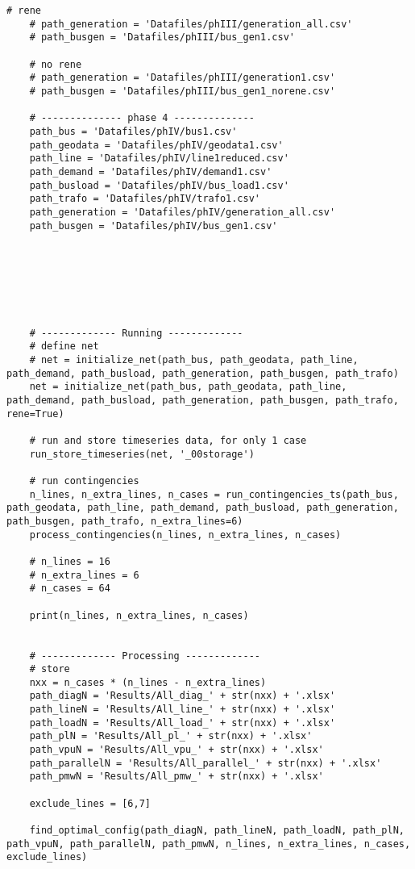 \begin{lstlisting}[caption={Main code in Python with the Pandapower library}]
    # rene
    # path_generation = 'Datafiles/phIII/generation_all.csv'
    # path_busgen = 'Datafiles/phIII/bus_gen1.csv'

    # no rene
    # path_generation = 'Datafiles/phIII/generation1.csv'
    # path_busgen = 'Datafiles/phIII/bus_gen1_norene.csv'

    # -------------- phase 4 --------------
    path_bus = 'Datafiles/phIV/bus1.csv'
    path_geodata = 'Datafiles/phIV/geodata1.csv'
    path_line = 'Datafiles/phIV/line1reduced.csv'
    path_demand = 'Datafiles/phIV/demand1.csv'
    path_busload = 'Datafiles/phIV/bus_load1.csv'
    path_trafo = 'Datafiles/phIV/trafo1.csv'
    path_generation = 'Datafiles/phIV/generation_all.csv'
    path_busgen = 'Datafiles/phIV/bus_gen1.csv'







    # ------------- Running -------------
    # define net
    # net = initialize_net(path_bus, path_geodata, path_line, path_demand, path_busload, path_generation, path_busgen, path_trafo)
    net = initialize_net(path_bus, path_geodata, path_line, path_demand, path_busload, path_generation, path_busgen, path_trafo, rene=True)

    # run and store timeseries data, for only 1 case
    run_store_timeseries(net, '_00storage')

    # run contingencies
    n_lines, n_extra_lines, n_cases = run_contingencies_ts(path_bus, path_geodata, path_line, path_demand, path_busload, path_generation, path_busgen, path_trafo, n_extra_lines=6)
    process_contingencies(n_lines, n_extra_lines, n_cases)

    # n_lines = 16
    # n_extra_lines = 6
    # n_cases = 64

    print(n_lines, n_extra_lines, n_cases)


    # ------------- Processing -------------
    # store
    nxx = n_cases * (n_lines - n_extra_lines)
    path_diagN = 'Results/All_diag_' + str(nxx) + '.xlsx'
    path_lineN = 'Results/All_line_' + str(nxx) + '.xlsx'
    path_loadN = 'Results/All_load_' + str(nxx) + '.xlsx'
    path_plN = 'Results/All_pl_' + str(nxx) + '.xlsx'
    path_vpuN = 'Results/All_vpu_' + str(nxx) + '.xlsx'
    path_parallelN = 'Results/All_parallel_' + str(nxx) + '.xlsx'
    path_pmwN = 'Results/All_pmw_' + str(nxx) + '.xlsx'

    exclude_lines = [6,7]

    find_optimal_config(path_diagN, path_lineN, path_loadN, path_plN, path_vpuN, path_parallelN, path_pmwN, n_lines, n_extra_lines, n_cases, exclude_lines)


\end{lstlisting}
